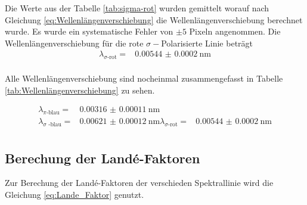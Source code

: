 Die Werte aus der Tabelle \autoref{tab:sigma-rot} wurden gemittelt worauf nach Gleichung \eqref{eq:Wellenlängenverschiebung} die Wellenlängenverschiebung berechnet wurde.
Es wurde ein systematische Fehler von $\pm 5$ Pixeln angenommen.
Die Wellenlängenverschiebung für die rote $\sigma -$Polarisierte Linie beträgt
\begin{align*}
    \lambda _\text{$\sigma$-rot} =&  \SI{0.00544(020)}{\nano\meter} \\
\end{align*}

Alle Wellenlängenverschiebung sind nocheinmal zusammengefasst in Tabelle \ref{tab:Wellenlängenverschiebung} zu sehen.

\begin{align}
    \lambda _\text{$\pi$-blau} = & \SI{0.00316(011)}{\nano\meter} \\
    \lambda _\text{$\sigma$ -blau} =& \SI{0.00621(012)}{\nano\meter}
    \lambda _\text{$\sigma$-rot} =&  \SI{0.00544(020)}{\nano\meter} \\
    \label{tab:Wellenlängenverschiebung_alle}
\end{align}

\subsection{Berechung der Landé-Faktoren}

Zur Berechung der Landé-Faktoren der verschieden Spektrallinie wird die Gleichung \eqref{eq:Lande_Faktor} genutzt.
